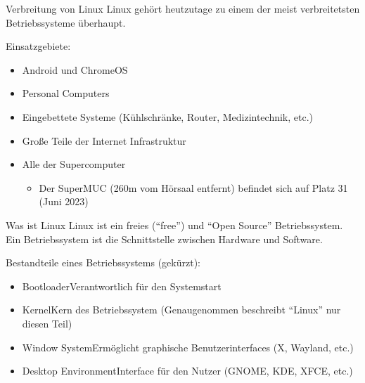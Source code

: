 \documentclass{setbeamer}
\begin{document}
\begin{frame}{Verbreitung von Linux}
    Linux gehört heutzutage zu einem der meist verbreitetsten Betriebssysteme überhaupt.

    Einsatzgebiete:
    \begin{itemize}
        \item Android und ChromeOS
        \item Personal Computers
        \item Eingebettete Systeme (Kühlschränke, Router, Medizintechnik, etc.)
        \item Große Teile der Internet Infrastruktur
        \item Alle der  Supercomputer
        \begin{itemize}
            \pause
            \item Der SuperMUC (260m vom Hörsaal entfernt) befindet sich auf Platz 31 (Juni 2023)
        \end{itemize}
    \end{itemize}
\end{frame}

\begin{frame}{Was ist Linux}
    Linux ist ein freies (``free'') und ``Open Source'' Betriebssystem. Ein Betriebssystem ist die Schnittstelle zwischen Hardware und Software.

    \vspace{0.3cm}

    Bestandteile eines Betriebssystems (gekürzt):
    \begin{itemize}
        \item Bootloader\textemdash Verantwortlich für den Systemstart
        \item Kernel\textemdash Kern des Betriebssystem (Genaugenommen beschreibt ``Linux'' nur diesen Teil)
        \item Window System\textemdash Ermöglicht graphische Benutzerinterfaces (X, Wayland, etc.)
        \item Desktop Environment\textemdash Interface für den Nutzer (GNOME, KDE, XFCE, etc.)

    \end{itemize}
\end{frame}
\end{document}
